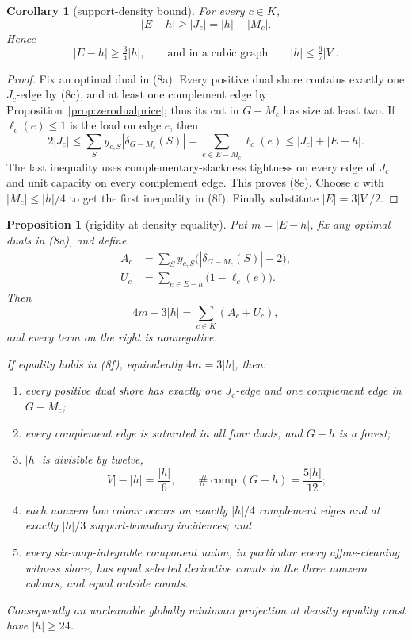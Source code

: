 \documentclass[11pt]{article}
\newtheorem{proposition}[theorem]{Proposition}
\newtheorem{corollary}[theorem]{Corollary}
\theoremstyle{definition}
\theoremstyle{remark}
\begin{document}
\begin{corollary}[support-density bound]\label{cor:supportdensity}
For every \(c\in K\),
\[
              |E-h|\ge |J_c|=|h|-|M_c|.                 \tag{8e}
\]
Hence
\[
              |E-h|\ge\tfrac34|h|,
 \qquad\text{and in a cubic graph}\qquad
              |h|\le\tfrac67|V|.                        \tag{8f}
\]
\end{corollary}

\begin{proof}
Fix an optimal dual in (8a).  Every positive dual shore contains exactly
one \(J_c\)-edge by (8c), and at least one complement edge by
Proposition~\ref{prop:zerodualprice}; thus its cut in \(G-M_c\) has size
at least two.  If \(\ell_c(e)\le1\) is the load on edge \(e\), then
\[
 2|J_c|
 \le\sum_Sy_{c,S}|\delta_{G-M_c}(S)|
 =\sum_{e\in E-M_c}\ell_c(e)
 \le |J_c|+|E-h|.                                      \tag{8g}
\]
The last inequality uses complementary-slackness tightness on every edge
of \(J_c\) and unit capacity on every complement edge.  This proves
(8e).  Choose \(c\) with \(|M_c|\le|h|/4\) to get the first inequality
in (8f).  Finally substitute \(|E|=3|V|/2\).
\end{proof}

\begin{proposition}[rigidity at density equality]
\label{prop:densityrigidity}
Put \(m=|E-h|\), fix any optimal duals in (8a), and define
\[
\begin{split}
 A_c&=\sum_Sy_{c,S}
       \bigl(|\delta_{G-M_c}(S)|-2\bigr),\\
 U_c&=\sum_{e\in E-h}\bigl(1-\ell_c(e)\bigr).
\end{split}                                               \tag{8h}
\]
Then
\[
                         4m-3|h|=\sum_{c\in K}(A_c+U_c), \tag{8i}
\]
and every term on the right is nonnegative.

If equality holds in (8f), equivalently \(4m=3|h|\), then:
\begin{enumerate}
  \item every positive dual shore has exactly one \(J_c\)-edge and one
        complement edge in \(G-M_c\);
  \item every complement edge is saturated in all four duals, and
        \(G-h\) is a forest;
  \item \(|h|\) is divisible by twelve,
        \[
        |V|-|h|=\frac{|h|}{6},\qquad
        \#\operatorname{comp}(G-h)=\frac{5|h|}{12};
        \tag{8j}
        \]
  \item each nonzero low colour occurs on exactly \(|h|/4\) complement
        edges and at exactly \(|h|/3\) support-boundary incidences; and
  \item every six-map-integrable component union, in particular every
        affine-cleaning witness shore, has equal selected derivative
        counts in the three nonzero colours, and equal outside counts.
\end{enumerate}
Consequently an uncleanable globally minimum projection at density
equality must have \(|h|\ge24\).
\end{proposition}
\end{document}
